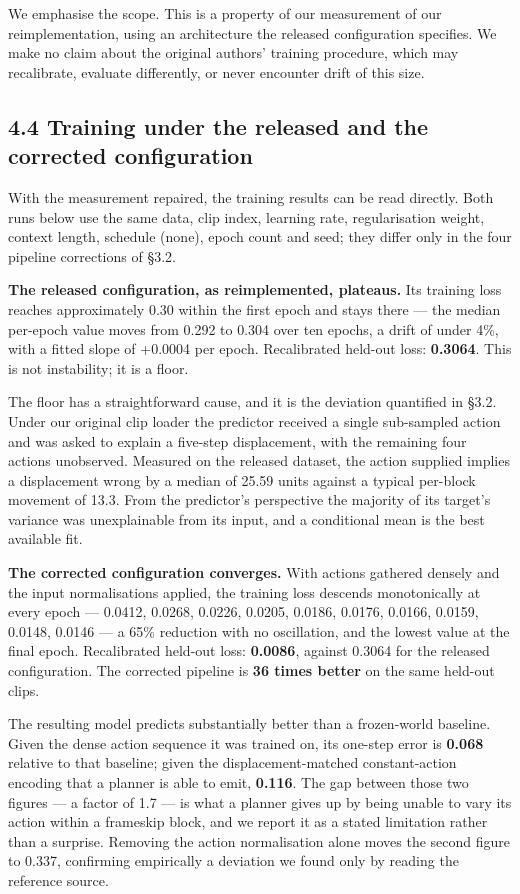 \documentclass[10pt]{article}
\newcounter{none}
\begin{document}
We emphasise the scope. This is a property of our measurement of our
reimplementation, using an architecture the released configuration specifies. We
make no claim about the original authors' training procedure, which may
recalibrate, evaluate differently, or never encounter drift of this size.

\subsection{4.4 Training under the released and the corrected configuration}\label{training-under-the-released-and-the-corrected-configuration}

With the measurement repaired, the training results can be read directly. Both
runs below use the same data, clip index, learning rate, regularisation weight,
context length, schedule (none), epoch count and seed; they differ only in the
four pipeline corrections of \S{}3.2.

\textbf{The released configuration, as reimplemented, plateaus.} Its training loss
reaches approximately 0.30 within the first epoch and stays there --- the median
per-epoch value moves from 0.292 to 0.304 over ten epochs, a drift of under 4\%,
with a fitted slope of +0.0004 per epoch. Recalibrated held-out loss: \textbf{0.3064}.
This is not instability; it is a floor.

The floor has a straightforward cause, and it is the deviation quantified in
\S{}3.2. Under our original clip loader the predictor received a single
sub-sampled action and was asked to explain a five-step displacement, with the
remaining four actions unobserved. Measured on the released dataset, the action
supplied implies a displacement wrong by a median of 25.59 units against a
typical per-block movement of 13.3. From the predictor's perspective the
majority of its target's variance was unexplainable from its input, and a
conditional mean is the best available fit.

\textbf{The corrected configuration converges.} With actions gathered densely and the
input normalisations applied, the training loss descends monotonically at every
epoch --- 0.0412, 0.0268, 0.0226, 0.0205, 0.0186, 0.0176, 0.0166, 0.0159, 0.0148,
0.0146 --- a 65\% reduction with no oscillation, and the lowest value at the final
epoch. Recalibrated held-out loss: \textbf{0.0086}, against 0.3064 for the released
configuration. The corrected pipeline is \textbf{36 times better} on the same
held-out clips.

The resulting model predicts substantially better than a frozen-world baseline.
Given the dense action sequence it was trained on, its one-step error is
\textbf{0.068} relative to that baseline; given the displacement-matched
constant-action encoding that a planner is able to emit, \textbf{0.116}. The gap
between those two figures --- a factor of 1.7 --- is what a planner gives up by
being unable to vary its action within a frameskip block, and we report it as a
stated limitation rather than a surprise. Removing the action normalisation
alone moves the second figure to 0.337, confirming empirically a deviation we
found only by reading the reference source.
\end{document}
